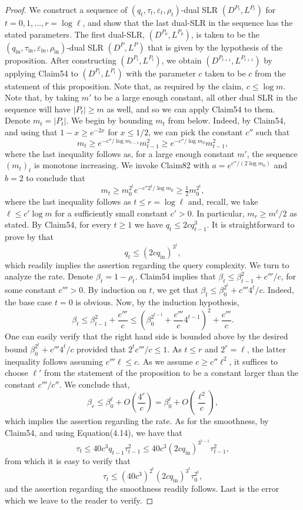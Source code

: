 \begin{proof}
We construct a sequence of $(q_t,\tau_t,\varepsilon_t,\rho_t)$-dual SLR $(D^{P_t},L^{P_t})$ for $t=0,1,\ldots,r=\log\ell$, and show that the last dual-SLR in the sequence has the stated parameters. The first dual-SLR, $(D^{P_0},L^{P_0})$, is taken to be the $(q_{\mathrm{in}},\tau_{\mathrm{in}},\varepsilon_{\mathrm{in}},\rho_{\mathrm{in}})$-dual SLR $(D^P,L^P)$ that is given by the hypothesis of the proposition. After constructing $(D^{P_t},L^{P_t})$, we obtain $(D^{P_{t+1}},L^{P_{t+1}})$ by applying Claim54 to $(D^{P_t},L^{P_t})$ with the parameter $c$ taken to be $c$ from the statement of this proposition. Note that, as required by the claim, $c\leq\log m$. Note that, by taking $m'$ to be a large enough constant, all other dual SLR in the sequence will have $|P_t|\geq m$ as well, and so we can apply Claim54 to them. Denote $m_t=|P_t|$. We begin by bounding $m_t$ from below. Indeed, by Claim54, and using that $1-x\geq e^{-2x}$ for $x\leq1/2$, we can pick the constant $c''$ such that
\[m_t\geq e^{-c''/\log m_{t-1}}m_{t-1}^2\geq e^{-c''/\log m_0}m_{t-1}^2,\]
where the last inequality follows as, for a large enough constant $m'$, the sequence $(m_t)_t$ is monotone increasing. We invoke Claim82 with $a=e^{c''/(2\log m_0)}$ and $b=2$ to conclude that
\[m_t\geq m_0^{2^t}e^{-c''2^t/\log m_0}\geq\tfrac12m_0^{2^t},\]
where the last inequality follows as $t\leq r=\log\ell$ and, recall, we take $\ell\leq c'\log m$ for a sufficiently small constant $c'>0$. In particular, $m_r\geq m^\ell/2$ as stated.
By Claim54, for every $t\geq1$ we have $q_t\leq2cq_{t-1}^3$. It is straightforward to prove by that
\begin{equation}q_t\leq(2cq_{\mathrm{in}})^{3^t},\tag{4.14}\end{equation}
which readily implies the assertion regarding the query complexity. We turn to analyze the rate. Denote $\beta_t=1-\rho_t$. Claim54 implies that $\beta_t\leq\beta_{t-1}^2+c'''/c$, for some constant $c'''>0$. By induction on $t$, we get that $\beta_t\leq\beta_0^{2^t}+c'''4^t/c$. Indeed, the base case $t=0$ is obvious. Now, by the induction hypothesis,
\[\beta_t\leq\beta_{t-1}^2+\frac{c'''}c\leq\left(\beta_0^{2^{t-1}}+\frac{c'''}c4^{t-1}\right)^2+\frac{c'''}c.\]
One can easily verify that the right hand side is bounded above by the desired bound $\beta_0^{2^t}+c'''4^t/c$ provided that $2^tc'''/c\leq1$. As $t\leq r$ and $2^r=\ell$, the latter inequality follows assuming $c'''\ell\leq c$. As we assume $c\geq c''\ell^2$, it suffices to choose $\ell'$ from the statement of the proposition to be a constant larger than the constant $c'''/c''$. We conclude that,
\[\beta_r\leq\beta_0^\ell+O\left(\frac{4^r}c\right)=\beta_0^\ell+O\left(\frac{\ell^2}c\right),\]
which implies the assertion regarding the rate.
As for the smoothness, by Claim54, and using Equation(4.14), we have that
\[\tau_t\leq40c^3q_{t-1}\tau_{t-1}^2\leq40c^3(2cq_{\mathrm{in}})^{3^{t-1}}\tau_{t-1}^2,\]
from which it is easy to verify that
\[\tau_t\leq(40c^3)^{2^t}(2cq_{\mathrm{in}})^{3^t}\tau_0^{2^t},\]
and the assertion regarding the smoothness readily follows. Last is the error which we leave to the reader to verify.
\end{proof}
